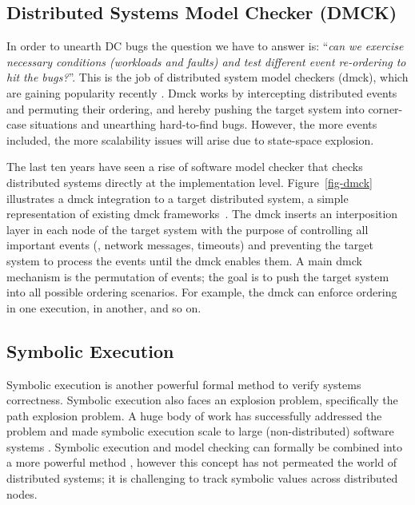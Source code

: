 \subsection{Distributed Systems Model Checker (DMCK)}
\label{sec-bg-dmck}

In order to unearth DC bugs the question we have to answer is: ``{\em can we
exercise necessary conditions (\ie workloads and faults) and test different
event re-ordering to hit the bugs?}''. This is the job of distributed system
model checkers (dmck), which are gaining popularity recently
\cite{Guo+11-Demeter, Killian+07-LifeDeathMaceMC, Simsa+10-Dbug,
Yang+09-Modist}. Dmck works by intercepting distributed events and permuting
their ordering, and hereby pushing the target system into corner-case situations
and unearthing hard-to-find bugs. However, the more events included, the more
scalability issues will arise due to state-space explosion.


The last ten years have seen a rise of software model checker that checks
distributed systems directly at the implementation level.  Figure~\ref{fig-dmck}
illustrates a dmck integration to a target distributed system, a simple
representation of existing dmck frameworks~\cite{Guo+11-Demeter,
Killian+07-LifeDeathMaceMC, Simsa+10-Dbug, Yang+09-Modist}.  The dmck inserts an
interposition layer in each node of the target system with the purpose of
controlling all important events (\eg, network messages, timeouts) and
preventing the target system to process the events until the dmck enables them.
A main dmck mechanism is the permutation of events; the goal is to push the
target system into all possible ordering scenarios.  For example, the dmck can
enforce  ordering in one execution,  in another, and so on.

\subsection{Symbolic Execution}
Symbolic execution is another powerful formal method to verify systems
correctness.  Symbolic execution also faces an explosion problem, specifically
the path explosion problem.  A huge body of work has successfully addressed the
problem and made symbolic execution scale to large (non-distributed) software
systems \cite{Bucur+11-ParallelSymEx, Cadar+08-KLEE, Chipounov+11-S2e,
Cui+13-RuleDirectedSymExec, Zamfir+10-Synthesis}.  Symbolic execution and model
checking can formally be combined into a more powerful
method \cite{Burch+92-SymbolicMC}, however this concept has not permeated the
world of distributed systems; it is challenging to track symbolic values across
distributed nodes.

